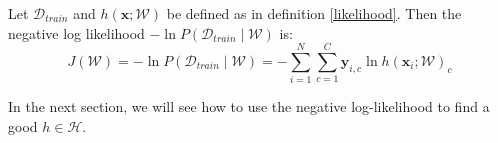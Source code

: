 \begin{definition}
	\label{negative_log-likelihood}
	Let $\mathcal{D}_{train}$ and $h(\mathbf{x}; \mathcal{W})$ be defined as in definition \ref{likelihood}. Then the negative log likelihood $-\ln P(\mathcal{D}_{train} \mid \mathcal{W})$ is:
	$$
	J(\mathcal{W}) = - \ln P(\mathcal{D}_{train} \mid \mathcal{W}) = - \sum\limits_{i=1}^N\sum\limits_{c=1}^C \mathbf{y}_{i,c} \ln h(\mathbf{x}_i;\mathcal{W})_c
	$$
\end{definition}
In the next section, we will see how to use the negative log-likelihood to find a good $h \in \mathcal{H}$.
